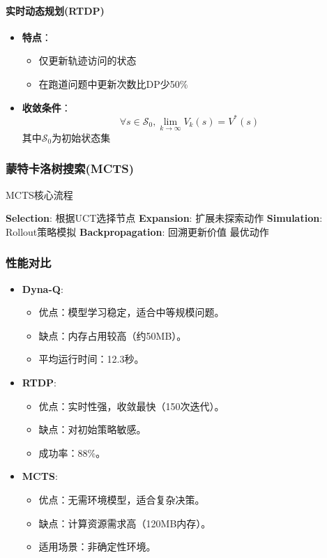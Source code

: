 \paragraph{实时动态规划(RTDP)}
\begin{itemize}
    \item \textbf{特点}：
        \begin{itemize}
            \item 仅更新轨迹访问的状态
            \item 在跑道问题中更新次数比DP少50\%
        \end{itemize}
    \item \textbf{收敛条件}：
        \[
        \forall s \in \mathcal{S}_0, \lim_{k\to\infty} V_k(s) = V^*(s)
        \]
        其中$\mathcal{S}_0$为初始状态集
\end{itemize}

\subsubsection{蒙特卡洛树搜索(MCTS)}
\begin{algorithm}[H]
    \caption{MCTS核心流程}
    \begin{algorithmic}[1]
            \STATE \textbf{Selection}: 根据UCT选择节点
            \STATE \textbf{Expansion}: 扩展未探索动作
            \STATE \textbf{Simulation}: Rollout策略模拟
            \STATE \textbf{Backpropagation}: 回溯更新价值
        \ENDWHILE
        \RETURN 最优动作
    \end{algorithmic}
\end{algorithm}

\subsubsection{性能对比}
\begin{itemize}
\item \textbf{Dyna-Q}:
  \begin{itemize}
  \item 优点：模型学习稳定，适合中等规模问题。
  \item 缺点：内存占用较高（约50MB）。
  \item 平均运行时间：12.3秒。
  \end{itemize}

\item \textbf{RTDP}:
  \begin{itemize}
  \item 优点：实时性强，收敛最快（150次迭代）。
  \item 缺点：对初始策略敏感。
  \item 成功率：88\%。
  \end{itemize}

\item \textbf{MCTS}:
  \begin{itemize}
  \item 优点：无需环境模型，适合复杂决策。
  \item 缺点：计算资源需求高（120MB内存）。
  \item 适用场景：非确定性环境。
  \end{itemize}
\end{itemize}

